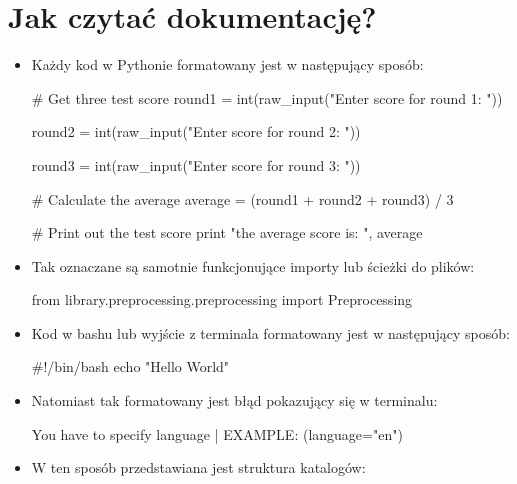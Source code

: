 \newpage
\section{Jak czytać dokumentację?}


\begin{itemize}
\item Każdy kod w Pythonie formatowany jest w następujący sposób:

\begin{python}
# Get three test score
round1 = int(raw_input("Enter score for round 1: "))

round2 = int(raw_input("Enter score for round 2: "))

round3 = int(raw_input("Enter score for round 3: "))
   
# Calculate the average
average = (round1 + round2 + round3) / 3

# Print out the test score
print "the average score is: ", average 

\end{python}

\item Tak oznaczane są samotnie funkcjonujące importy lub ścieżki do plików:
\begin{import}
from library.preprocessing.preprocessing import Preprocessing
\end{import}

\item Kod w bashu lub wyjście z terminala formatowany jest w następujący sposób:

\begin{bash}
#!/bin/bash
echo "Hello World"
\end{bash}

\item Natomiast tak formatowany jest błąd pokazujący się w terminalu:
\begin{consolerror}
You have to specify language | EXAMPLE: (language="en")
\end{consolerror}



\item W ten sposób przedstawiana jest struktura katalogów:
\myspace
{}

\end{itemize}